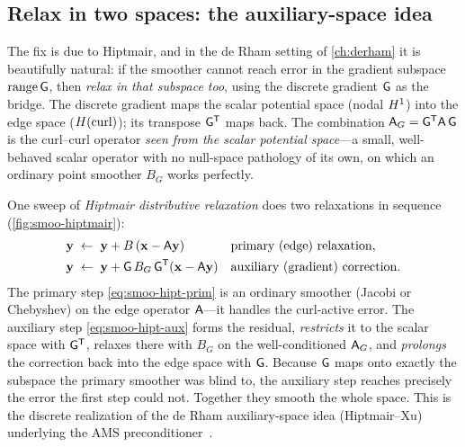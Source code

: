 \subsection{Relax in two spaces: the auxiliary-space idea}

The fix is due to Hiptmair, and in the de Rham setting of \cref{ch:derham} it is
beautifully natural: if the smoother cannot reach error in the gradient subspace
$\operatorname{range}\mathsf{G}$, then \emph{relax in that subspace too}, using the
discrete gradient $\mathsf{G}$ as the bridge. The discrete gradient maps the scalar
potential space (nodal $H^1$) into the edge space ($H(\mathrm{curl})$); its transpose
$\mathsf{G}^{\mathsf T}$ maps back. The combination
$\mathsf{A}_G = \mathsf{G}^{\mathsf T}\mathsf{A}\,\mathsf{G}$ is the curl--curl operator
\emph{seen from the scalar potential space}---a small, well-behaved scalar operator
with no null-space pathology of its own, on which an ordinary point smoother $B_G$
works perfectly.

One sweep of \emph{Hiptmair distributive relaxation} does two relaxations in
sequence (\cref{fig:smoo-hiptmair}):
\begin{align}
  \mathbf{y} &\;\leftarrow\; \mathbf{y} + B\,(\mathbf{x} - \mathsf{A}\mathbf{y})
      && \text{primary (edge) relaxation,} \label{eq:smoo-hipt-prim}\\
  \mathbf{y} &\;\leftarrow\; \mathbf{y} + \mathsf{G}\,B_G\,\mathsf{G}^{\mathsf T}(\mathbf{x} - \mathsf{A}\mathbf{y})
      && \text{auxiliary (gradient) correction.} \label{eq:smoo-hipt-aux}
\end{align}
The primary step \cref{eq:smoo-hipt-prim} is an ordinary smoother (Jacobi or
Chebyshev) on the edge operator $\mathsf{A}$---it handles the curl-active error. The
auxiliary step \cref{eq:smoo-hipt-aux} forms the residual, \emph{restricts} it to
the scalar space with $\mathsf{G}^{\mathsf T}$, relaxes there with $B_G$ on the
well-conditioned $\mathsf{A}_G$, and \emph{prolongs} the correction back into the edge
space with $\mathsf{G}$. Because $\mathsf{G}$ maps onto exactly the subspace the primary
smoother was blind to, the auxiliary step reaches precisely the error the first step
could not. Together they smooth the whole space. This is the discrete realization of
the de Rham auxiliary-space idea (Hiptmair--Xu) underlying the AMS
preconditioner~\citep{hiptmairxu2007}.

